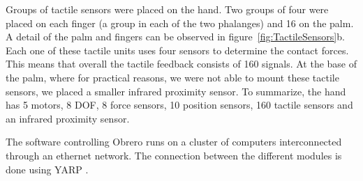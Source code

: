 Groups of tactile sensors were placed on the hand. Two groups of
four were placed on each finger (a group in each of the two
phalanges) and 16 on the palm. A detail of the palm and fingers
can be observed in figure~\ref{fig:TactileSensors}b. Each one of
these tactile units uses four sensors to determine the contact
forces. This means that overall the tactile feedback consists of
160 signals. At the base of the palm, where for practical reasons,
we were not able to mount these tactile sensors, we placed a
smaller infrared proximity sensor. To summarize, the hand has 5
motors, 8 DOF, 8 force sensors, 10 position sensors, 160 tactile
sensors and an infrared proximity sensor.

The software controlling Obrero runs on a cluster of computers
interconnected through an ethernet network. The connection between
the different modules is done using YARP \cite{yarpPaper}.
